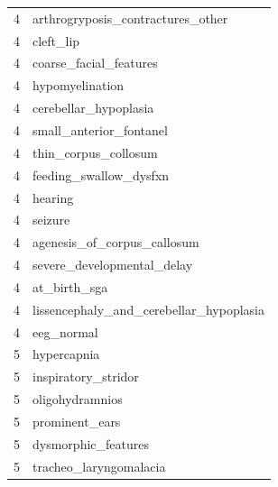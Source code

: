 \documentclass[
  letterpaper,
  DIV=11,
  numbers=noendperiod]{scrartcl}
\begin{document}
\begin{longtable}[]{@{}rl@{}}
4 & arthrogryposis\_contractures\_other \\
4 & cleft\_lip \\
4 & coarse\_facial\_features \\
4 & hypomyelination \\
4 & cerebellar\_hypoplasia \\
4 & small\_anterior\_fontanel \\
4 & thin\_corpus\_collosum \\
4 & feeding\_swallow\_dysfxn \\
4 & hearing \\
4 & seizure \\
4 & agenesis\_of\_corpus\_callosum \\
4 & severe\_developmental\_delay \\
4 & at\_birth\_sga \\
4 & lissencephaly\_and\_cerebellar\_hypoplasia \\
4 & eeg\_normal \\
5 & hypercapnia \\
5 & inspiratory\_stridor \\
5 & oligohydramnios \\
5 & prominent\_ears \\
5 & dysmorphic\_features \\
5 & tracheo\_laryngomalacia \\
\bottomrule()
\end{longtable}
\end{document}
